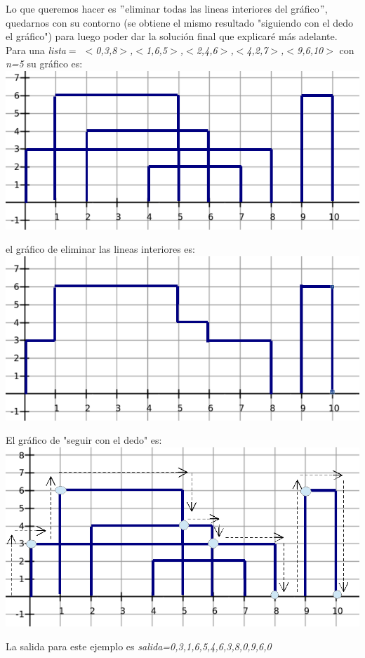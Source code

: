 \documentclass{article}
\begin{document}
Lo que queremos hacer es $"$eliminar todas las lineas interiores del gr\'afico$"$, quedarnos con su contorno (se obtiene el mismo resultado  "siguiendo con el dedo el gr\'afico") para luego poder dar la solución final que explicaré más adelante. \newpage
Para una \textit{lista$=$ $<$0,3,8$>$,$<$1,6,5$>$,$<$2,4,6$>$,$<$4,2,7$>$,$<$9,6,10$>$} con \textit{n=5} su gr\'afico es: \newline
\includegraphics[width=\textwidth,height=\textheight,keepaspectratio
]{edificiosGraf2.png}
\begin {flushleft}
\end{flushleft}
el gr\'afico de eliminar las lineas interiores es:\newline
\includegraphics[width=\textwidth,height=\textheight,keepaspectratio
]{edificiosGraf2b.png}
\begin {flushleft}
\end{flushleft}
\newpage
El gr\'afico de "seguir con el dedo" es: \newline
\includegraphics[width=\textwidth,height=\textheight,keepaspectratio
]{edificiosGraf2c.png}
\begin {flushleft}
La salida para este ejemplo es \textit{salida={0,3,1,6,5,4,6,3,8,0,9,6,0}}
\end{flushleft}
\end{document}
